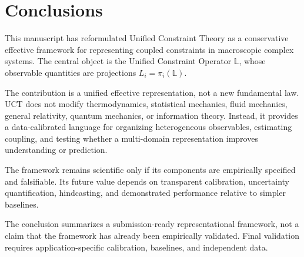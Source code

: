 ﻿\section{Conclusions}


This manuscript has reformulated Unified Constraint Theory as a conservative effective framework for representing coupled constraints in macroscopic complex systems. The central object is the Unified Constraint Operator \(\mathbb{L}\), whose observable quantities are projections \(L_i=\pi_i(\mathbb{L})\).

The contribution is a unified effective representation, not a new fundamental law. UCT does not modify thermodynamics, statistical mechanics, fluid mechanics, general relativity, quantum mechanics, or information theory. Instead, it provides a data-calibrated language for organizing heterogeneous observables, estimating coupling, and testing whether a multi-domain representation improves understanding or prediction.

The framework remains scientific only if its components are empirically specified and falsifiable. Its future value depends on transparent calibration, uncertainty quantification, hindcasting, and demonstrated performance relative to simpler baselines.

The conclusion summarizes a submission-ready representational framework, not a claim that the framework has already been empirically validated. Final validation requires application-specific calibration, baselines, and independent data.


